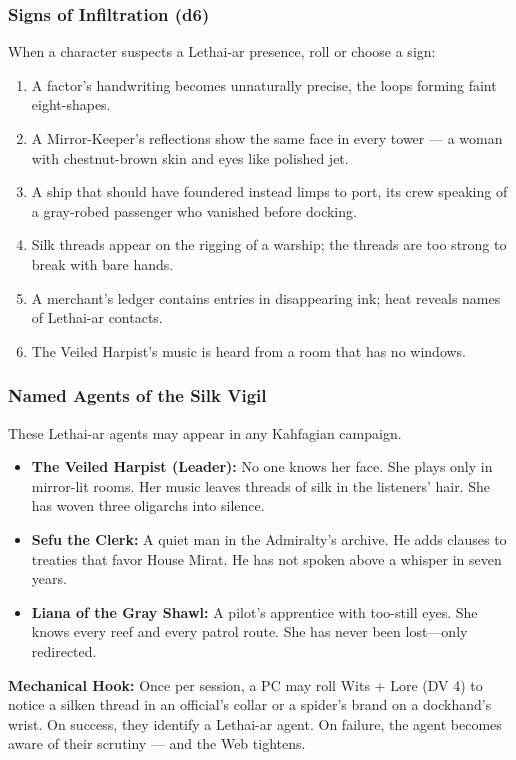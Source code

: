 \subsubsection*{Signs of Infiltration (d6)}
When a character suspects a Lethai-ar presence, roll or choose a sign:

\begin{enumerate}
  \item A factor's handwriting becomes unnaturally precise, the loops forming faint eight-shapes.
  \item A Mirror-Keeper's reflections show the same face in every tower --- a woman with chestnut-brown skin and eyes like polished jet.
  \item A ship that should have foundered instead limps to port, its crew speaking of a gray-robed passenger who vanished before docking.
  \item Silk threads appear on the rigging of a warship; the threads are too strong to break with bare hands.
  \item A merchant's ledger contains entries in disappearing ink; heat reveals names of Lethai-ar contacts.
  \item The Veiled Harpist's music is heard from a room that has no windows.
\end{enumerate}

\subsubsection*{Named Agents of the Silk Vigil}
These Lethai-ar agents may appear in any Kahfagian campaign.

\begin{itemize}
  \item \textbf{The Veiled Harpist (Leader):} No one knows her face. She plays only in mirror-lit rooms. Her music leaves threads of silk in the listeners' hair. She has woven three oligarchs into silence.
  \item \textbf{Sefu the Clerk:} A quiet man in the Admiralty's archive. He adds clauses to treaties that favor House Mirat. He has not spoken above a whisper in seven years.
  \item \textbf{Liana of the Gray Shawl:} A pilot's apprentice with too-still eyes. She knows every reef and every patrol route. She has never been lost---only redirected.
\end{itemize}

\textbf{Mechanical Hook:} Once per session, a PC may roll Wits + Lore (DV 4) to notice a silken thread in an official's collar or a spider's brand on a dockhand's wrist. On success, they identify a Lethai-ar agent. On failure, the agent becomes aware of their scrutiny --- and the Web tightens.

